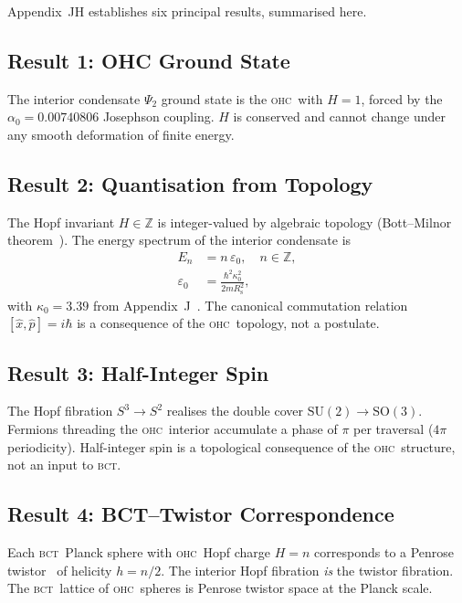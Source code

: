 \documentclass[aps,prl,twocolumn,superscriptaddress,floatfix]{revtex4-2}
\newcommand{\az}{\alpha_0}
\newcommand{\BCT}{\textsc{bct}}
\newcommand{\OHC}{\textsc{ohc}}
\newcommand{\Psiint}{\Psi_2}
\newcommand{\kz}{\kappa_0}
\newcommand{\HopfN}{H}
\newcommand{\Rsph}{R_{\mathrm{s}}}
\begin{document}
Appendix~JH establishes six principal results, summarised here.

\subsection{Result 1: OHC Ground State}

The interior condensate $\Psiint$ ground state is the \OHC\ with
$\HopfN=1$, forced by the $\az=0.00740806$ Josephson coupling.
$\HopfN$ is conserved and cannot change under any smooth deformation
of finite energy.

\subsection{Result 2: Quantisation from Topology}

The Hopf invariant $\HopfN\in\mathbb{Z}$ is integer-valued by algebraic
topology (Bott--Milnor theorem~\cite{Bott1958}).
The energy spectrum of the interior condensate is
\begin{align}
  E_n &= n\,\varepsilon_0, \quad n\in\mathbb{Z}, \nonumber\\
  \varepsilon_0 &= \frac{\hbar^2\kz^2}{2m\Rsph^2},
  \label{eq:spectrum}
\end{align}
with $\kz=3.39$ from Appendix~J~\cite{AppJ}.
The canonical commutation relation $[\hat{x},\hat{p}]=i\hbar$ is a
consequence of the \OHC\ topology, not a postulate.

\subsection{Result 3: Half-Integer Spin}

The Hopf fibration $S^3\to S^2$ realises the double cover
$\mathrm{SU}(2)\to\mathrm{SO}(3)$.
Fermions threading the \OHC\ interior accumulate a phase of $\pi$ per
traversal ($4\pi$ periodicity).
Half-integer spin is a topological consequence of the \OHC\ structure,
not an input to \BCT.

\subsection{Result 4: BCT--Twistor Correspondence}

Each \BCT\ Planck sphere with \OHC\ Hopf charge $\HopfN=n$ corresponds
to a Penrose twistor~\cite{Penrose1967,PR1986} of helicity $h=n/2$.
The interior Hopf fibration \emph{is} the twistor fibration.
The \BCT\ lattice of \OHC\ spheres is Penrose twistor space at the
Planck scale.
\end{document}
